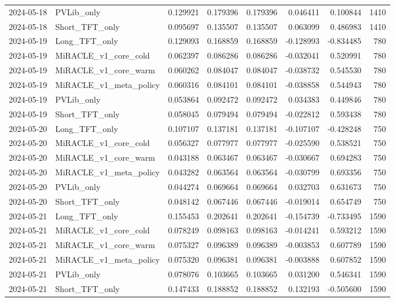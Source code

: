 \begin{tabular}{llrrrrrr}
2024-05-18 & PVLib_only & 0.129921 & 0.179396 & 0.179396 & 0.046411 & 0.100844 & 1410 \\
2024-05-18 & Short_TFT_only & 0.095697 & 0.135507 & 0.135507 & 0.063099 & 0.486983 & 1410 \\
2024-05-19 & Long_TFT_only & 0.129093 & 0.168859 & 0.168859 & -0.128993 & -0.834485 & 780 \\
2024-05-19 & MiRACLE_v1_core_cold & 0.062397 & 0.086286 & 0.086286 & -0.032041 & 0.520991 & 780 \\
2024-05-19 & MiRACLE_v1_core_warm & 0.060262 & 0.084047 & 0.084047 & -0.038732 & 0.545530 & 780 \\
2024-05-19 & MiRACLE_v1_meta_policy & 0.060316 & 0.084101 & 0.084101 & -0.038858 & 0.544943 & 780 \\
2024-05-19 & PVLib_only & 0.053864 & 0.092472 & 0.092472 & 0.034383 & 0.449846 & 780 \\
2024-05-19 & Short_TFT_only & 0.058045 & 0.079494 & 0.079494 & -0.022812 & 0.593438 & 780 \\
2024-05-20 & Long_TFT_only & 0.107107 & 0.137181 & 0.137181 & -0.107107 & -0.428248 & 750 \\
2024-05-20 & MiRACLE_v1_core_cold & 0.056327 & 0.077977 & 0.077977 & -0.025590 & 0.538521 & 750 \\
2024-05-20 & MiRACLE_v1_core_warm & 0.043188 & 0.063467 & 0.063467 & -0.030667 & 0.694283 & 750 \\
2024-05-20 & MiRACLE_v1_meta_policy & 0.043282 & 0.063564 & 0.063564 & -0.030799 & 0.693356 & 750 \\
2024-05-20 & PVLib_only & 0.044274 & 0.069664 & 0.069664 & 0.032703 & 0.631673 & 750 \\
2024-05-20 & Short_TFT_only & 0.048142 & 0.067446 & 0.067446 & -0.019014 & 0.654749 & 750 \\
2024-05-21 & Long_TFT_only & 0.155453 & 0.202641 & 0.202641 & -0.154739 & -0.733495 & 1590 \\
2024-05-21 & MiRACLE_v1_core_cold & 0.078249 & 0.098163 & 0.098163 & -0.014241 & 0.593212 & 1590 \\
2024-05-21 & MiRACLE_v1_core_warm & 0.075327 & 0.096389 & 0.096389 & -0.003853 & 0.607789 & 1590 \\
2024-05-21 & MiRACLE_v1_meta_policy & 0.075320 & 0.096381 & 0.096381 & -0.003888 & 0.607852 & 1590 \\
2024-05-21 & PVLib_only & 0.078076 & 0.103665 & 0.103665 & 0.031200 & 0.546341 & 1590 \\
2024-05-21 & Short_TFT_only & 0.147433 & 0.188852 & 0.188852 & 0.132193 & -0.505600 & 1590 \\

\end{tabular}
